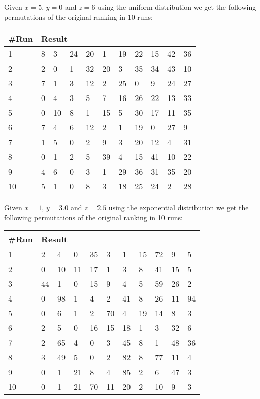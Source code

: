 Given $x=5$, $y=0$ and $z=6$ using the uniform distribution we get the following permutations of the original ranking in 10 runs:


\begin{table}[H]
	\centering
	\begin{tabular}{*{11}l}
	\toprule
	\multicolumn{1}{l}{\#Run} & \multicolumn{10}{l}{Result} \\ \midrule
	1 	& 8 & 3 &  24 &  20 &  1 &  19 &  22 &  15 &  42 &  36 \\
	2 	& 2 &  0 &  1 &  32 &  20 &  3 &  35 &  34 &  43 &  10 \\
	3	& 7 &  1 &  3 &  12 &  2 &  25 &  0 &  9 &  24 &  27\\
	4	& 0 &  4 &  3 &  5 &  7 &  16 &  26 &  22 &  13 &  33\\
	5	& 0 &  10 &  8 &  1 &  15 &  5 &  30 &  17 &  11 &  35\\
	6	& 7 &  4 &  6 &  12 &  2 &  1 &  19 &  0 &  27 &  9\\
	7	& 1 &  5 &  0 &  2 &  9 &  3 &  20 &  12 &  4 &  31\\
	8	& 0 &  1 &  2 &  5 &  39 &  4 &  15 &  41 &  10 &  22\\
	9	& 4 &  6 &  0 &  3 &  1 &  29 &  36 &  31 &  35 &  20\\
	10	& 5 &  1 &  0 &  8 &  3 &  18 &  25 & 24 & 2 & 28\\
	\bottomrule
\end{tabular}
\end{table}

Given $x=1$, $y=3.0$ and $z=2.5$ using the exponential distribution we get the following permutations of the original ranking in 10 runs:

\begin{table}[H]
	\centering
	\begin{tabular}{*{11}l}
	\toprule
	\multicolumn{1}{l}{\#Run} & \multicolumn{10}{l}{Result} \\ \midrule
	1	& 2 &  4 &  0 &  35 &  3 &  1 &  15 &  72 &  9 &  5\\
	2	& 0 &  10 &  11 &  17 &  1 &  3 &  8 &  41 &  15 &  5\\
	3	& 44 &  1 &  0 &  15 &  9 &  4 &  5 &  59 &  26 &  2\\
	4	& 0 &  98 &  1 &  4 &  2 &  41 &  8 &  26 &  11 &  94\\
	5	& 0 &  6 &  1 &  2 &  70 &  4 &  19 &  14 &  8 &  3\\
	6	& 2 &  5 &  0 &  16 &  15 &  18 &  1 &  3 &  32 &  6\\
	7	& 2 &  65 &  4 &  0 &  3 &  45 &  8 &  1 &  48 &  36\\
	8	& 3 &  49 &  5 &  0 &  2 &  82 &  8 &  77 &  11 &  4\\
	9	& 0 &  1 &  21 &  8 &  4 &  85 &  2 &  6 &  47 &  3\\
	10	& 0 &  1 &  21 &  70 &  11 &  20 &  2 & 10 & 9& 3 \\
	\bottomrule
\end{tabular}
\end{table}

